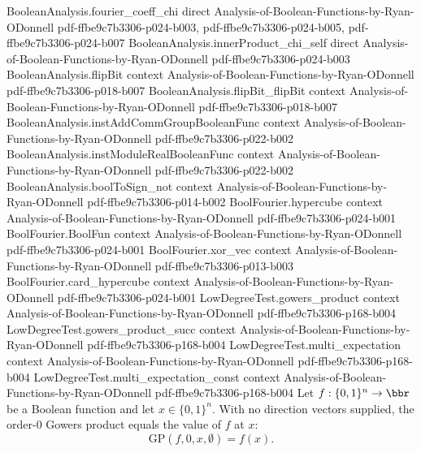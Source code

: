 \begin{lemma}
\proofstep
  {BooleanAnalysis.fourier_coeff_chi}
  {direct}
  {Analysis-of-Boolean-Functions-by-Ryan-ODonnell}
  {pdf-ffbe9c7b3306-p024-b003,
    pdf-ffbe9c7b3306-p024-b005,
    pdf-ffbe9c7b3306-p024-b007}
\proofstep
  {BooleanAnalysis.innerProduct_chi_self}
  {direct}
  {Analysis-of-Boolean-Functions-by-Ryan-ODonnell}
  {pdf-ffbe9c7b3306-p024-b003}
\proofstep
  {BooleanAnalysis.flipBit}
  {context}
  {Analysis-of-Boolean-Functions-by-Ryan-ODonnell}
  {pdf-ffbe9c7b3306-p018-b007}
\proofstep
  {BooleanAnalysis.flipBit_flipBit}
  {context}
  {Analysis-of-Boolean-Functions-by-Ryan-ODonnell}
  {pdf-ffbe9c7b3306-p018-b007}
\proofstep
  {BooleanAnalysis.instAddCommGroupBooleanFunc}
  {context}
  {Analysis-of-Boolean-Functions-by-Ryan-ODonnell}
  {pdf-ffbe9c7b3306-p022-b002}
\proofstep
  {BooleanAnalysis.instModuleRealBooleanFunc}
  {context}
  {Analysis-of-Boolean-Functions-by-Ryan-ODonnell}
  {pdf-ffbe9c7b3306-p022-b002}
\proofstep
  {BooleanAnalysis.boolToSign_not}
  {context}
  {Analysis-of-Boolean-Functions-by-Ryan-ODonnell}
  {pdf-ffbe9c7b3306-p014-b002}
\proofstep
  {BoolFourier.hypercube}
  {context}
  {Analysis-of-Boolean-Functions-by-Ryan-ODonnell}
  {pdf-ffbe9c7b3306-p024-b001}
\proofstep
  {BoolFourier.BoolFun}
  {context}
  {Analysis-of-Boolean-Functions-by-Ryan-ODonnell}
  {pdf-ffbe9c7b3306-p024-b001}
\proofstep
  {BoolFourier.xor_vec}
  {context}
  {Analysis-of-Boolean-Functions-by-Ryan-ODonnell}
  {pdf-ffbe9c7b3306-p013-b003}
\proofstep
  {BoolFourier.card_hypercube}
  {context}
  {Analysis-of-Boolean-Functions-by-Ryan-ODonnell}
  {pdf-ffbe9c7b3306-p024-b001}
\proofstep
  {LowDegreeTest.gowers_product}
  {context}
  {Analysis-of-Boolean-Functions-by-Ryan-ODonnell}
  {pdf-ffbe9c7b3306-p168-b004}
\proofstep
  {LowDegreeTest.gowers_product_succ}
  {context}
  {Analysis-of-Boolean-Functions-by-Ryan-ODonnell}
  {pdf-ffbe9c7b3306-p168-b004}
\proofstep
  {LowDegreeTest.multi_expectation}
  {context}
  {Analysis-of-Boolean-Functions-by-Ryan-ODonnell}
  {pdf-ffbe9c7b3306-p168-b004}
\proofstep
  {LowDegreeTest.multi_expectation_const}
  {context}
  {Analysis-of-Boolean-Functions-by-Ryan-ODonnell}
  {pdf-ffbe9c7b3306-p168-b004}
Let $f : \{0,1\}^n \to \bbr$ be a Boolean function and let $x \in \{0,1\}^n$. With no
direction vectors supplied, the order-$0$ Gowers product equals the value of $f$ at $x$:
\[
  \mathrm{GP}(f, 0, x, \emptyset) = f(x).
\]
\end{lemma}

